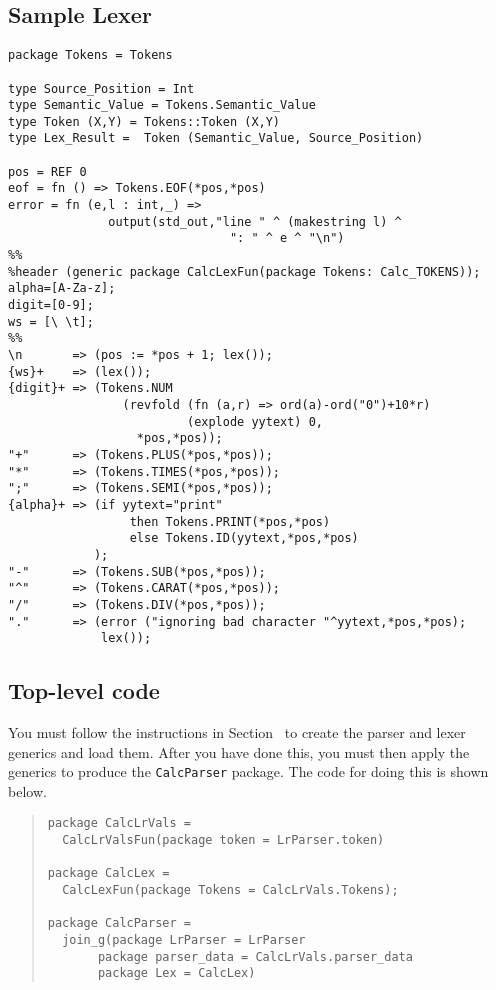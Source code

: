 \subsection{Sample Lexer}
\begin{tt}
\begin{verbatim}
package Tokens = Tokens

type Source_Position = Int
type Semantic_Value = Tokens.Semantic_Value
type Token (X,Y) = Tokens::Token (X,Y)
type Lex_Result =  Token (Semantic_Value, Source_Position)

pos = REF 0
eof = fn () => Tokens.EOF(*pos,*pos)
error = fn (e,l : int,_) =>
              output(std_out,"line " ^ (makestring l) ^
                               ": " ^ e ^ "\n")
%%
%header (generic package CalcLexFun(package Tokens: Calc_TOKENS));
alpha=[A-Za-z];
digit=[0-9];
ws = [\ \t];
%%
\n       => (pos := *pos + 1; lex());
{ws}+    => (lex());
{digit}+ => (Tokens.NUM
                (revfold (fn (a,r) => ord(a)-ord("0")+10*r)
                         (explode yytext) 0,
                  *pos,*pos));
"+"      => (Tokens.PLUS(*pos,*pos));
"*"      => (Tokens.TIMES(*pos,*pos));
";"      => (Tokens.SEMI(*pos,*pos));
{alpha}+ => (if yytext="print"
                 then Tokens.PRINT(*pos,*pos)
                 else Tokens.ID(yytext,*pos,*pos)
            );
"-"      => (Tokens.SUB(*pos,*pos));
"^"      => (Tokens.CARAT(*pos,*pos));
"/"      => (Tokens.DIV(*pos,*pos));
"."      => (error ("ignoring bad character "^yytext,*pos,*pos);
             lex());
\end{verbatim}
\end{tt}
\subsection{Top-level code}

You must follow the instructions in Section~
to create the parser and lexer generics and load them.  After you have
done this, you must then apply the generics to produce the {\tt CalcParser}
package.  The code for doing this is shown below.
\begin{quote}
\begin{verbatim}
package CalcLrVals =
  CalcLrValsFun(package token = LrParser.token)

package CalcLex =
  CalcLexFun(package Tokens = CalcLrVals.Tokens);

package CalcParser =
  join_g(package LrParser = LrParser
       package parser_data = CalcLrVals.parser_data
       package Lex = CalcLex)
\end{verbatim}
\end{quote}
 
